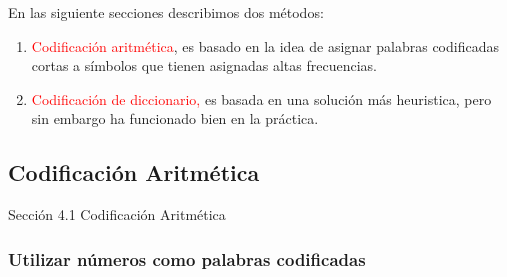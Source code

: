 \documentclass{beamer}
\theoremstyle{plain}
\theoremstyle{example}
\theoremstyle{example}
\begin{document}
\begin{frame}  \small

En las siguiente secciones describimos  dos métodos:

\begin{enumerate}
\item \textcolor{red}{Codificación aritmética}, es basado en la idea de asignar palabras codificadas cortas a símbolos que tienen asignadas altas frecuencias. 
\item \textcolor{red}{Codificación de diccionario,} es basada en una solución más heuristica, pero sin embargo ha funcionado bien en la práctica. 
\end{enumerate}

 \end{frame} 


\subsection{Codificación Aritmética}
\begin{frame}   \footnotesize
{
\begin{block}{Sección 4.1}
Codificación Aritmética
\end{block}
}
\end{frame} 


\subsubsection{Utilizar números como palabras codificadas}
\end{document}
